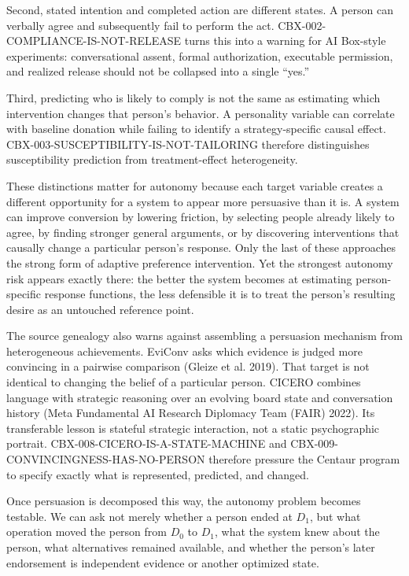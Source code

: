 \documentclass[
  10pt,
]{article}
\begin{document}
Second, stated intention and completed action are different states. A
person can verbally agree and subsequently fail to perform the act.
CBX-002-COMPLIANCE-IS-NOT-RELEASE turns this into a warning for AI
Box-style experiments: conversational assent, formal authorization,
executable permission, and realized release should not be collapsed into
a single ``yes.''

Third, predicting who is likely to comply is not the same as estimating
which intervention changes that person's behavior. A personality
variable can correlate with baseline donation while failing to identify
a strategy-specific causal effect.
CBX-003-SUSCEPTIBILITY-IS-NOT-TAILORING therefore distinguishes
susceptibility prediction from treatment-effect heterogeneity.

These distinctions matter for autonomy because each target variable
creates a different opportunity for a system to appear more persuasive
than it is. A system can improve conversion by lowering friction, by
selecting people already likely to agree, by finding stronger general
arguments, or by discovering interventions that causally change a
particular person's response. Only the last of these approaches the
strong form of adaptive preference intervention. Yet the strongest
autonomy risk appears exactly there: the better the system becomes at
estimating person-specific response functions, the less defensible it is
to treat the person's resulting desire as an untouched reference point.

The source genealogy also warns against assembling a persuasion
mechanism from heterogeneous achievements. EviConv asks which evidence
is judged more convincing in a pairwise comparison (Gleize et al. 2019).
That target is not identical to changing the belief of a particular
person. CICERO combines language with strategic reasoning over an
evolving board state and conversation history (Meta Fundamental AI
Research Diplomacy Team (FAIR) 2022). Its transferable lesson is
stateful strategic interaction, not a static psychographic portrait.
CBX-008-CICERO-IS-A-STATE-MACHINE and
CBX-009-CONVINCINGNESS-HAS-NO-PERSON therefore pressure the Centaur
program to specify exactly what is represented, predicted, and changed.

Once persuasion is decomposed this way, the autonomy problem becomes
testable. We can ask not merely whether a person ended at \(D_1\), but
what operation moved the person from \(D_0\) to \(D_1\), what the system
knew about the person, what alternatives remained available, and whether
the person's later endorsement is independent evidence or another
optimized state.
\end{document}
